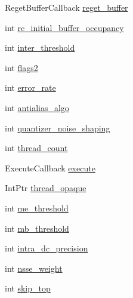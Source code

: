 \begin{DoxyCompactItemize}
RegetBufferCallback \hyperlink{struct_tao_1_1_f_fmpeg_1_1_f_fmpeg_1_1_a_v_codec_context_a8ffd6031f69dd5ce41136d91814a3319}{reget\_\-buffer}
\item 
int \hyperlink{struct_tao_1_1_f_fmpeg_1_1_f_fmpeg_1_1_a_v_codec_context_a3e2e4582550934341278cf82d6729469}{rc\_\-initial\_\-buffer\_\-occupancy}
\item 
int \hyperlink{struct_tao_1_1_f_fmpeg_1_1_f_fmpeg_1_1_a_v_codec_context_a86eb266bbe2b30943be9f0583295b32f}{inter\_\-threshold}
\item 
int \hyperlink{struct_tao_1_1_f_fmpeg_1_1_f_fmpeg_1_1_a_v_codec_context_a28bb12c9c401b6240677df9f54ca88d1}{flags2}
\item 
int \hyperlink{struct_tao_1_1_f_fmpeg_1_1_f_fmpeg_1_1_a_v_codec_context_a08aec2b15e9572f2fa0b3694540272e8}{error\_\-rate}
\item 
int \hyperlink{struct_tao_1_1_f_fmpeg_1_1_f_fmpeg_1_1_a_v_codec_context_aa4d47b1e9e54329c794f3a90cc9f3600}{antialias\_\-algo}
\item 
int \hyperlink{struct_tao_1_1_f_fmpeg_1_1_f_fmpeg_1_1_a_v_codec_context_a2b551fbb06e37e03790f4be0f0a1bb8d}{quantizer\_\-noise\_\-shaping}
\item 
int \hyperlink{struct_tao_1_1_f_fmpeg_1_1_f_fmpeg_1_1_a_v_codec_context_a73ba3575babb9cd5543c81530a3085af}{thread\_\-count}
\item 
ExecuteCallback \hyperlink{struct_tao_1_1_f_fmpeg_1_1_f_fmpeg_1_1_a_v_codec_context_a715241b68abafe3d68f967b13e514bec}{execute}
\item 
IntPtr \hyperlink{struct_tao_1_1_f_fmpeg_1_1_f_fmpeg_1_1_a_v_codec_context_a68282e79583391c677104895769a5251}{thread\_\-opaque}
\item 
int \hyperlink{struct_tao_1_1_f_fmpeg_1_1_f_fmpeg_1_1_a_v_codec_context_a7655069d77b5fe638abf7f8ae54a1f26}{me\_\-threshold}
\item 
int \hyperlink{struct_tao_1_1_f_fmpeg_1_1_f_fmpeg_1_1_a_v_codec_context_a100ef2571ff67ad51643a2c1a68d080a}{mb\_\-threshold}
\item 
int \hyperlink{struct_tao_1_1_f_fmpeg_1_1_f_fmpeg_1_1_a_v_codec_context_aac12774efc670bf0d1983e8858ac0fc3}{intra\_\-dc\_\-precision}
\item 
int \hyperlink{struct_tao_1_1_f_fmpeg_1_1_f_fmpeg_1_1_a_v_codec_context_ada6d5e69e5a1b09065fef8645cc4f3ab}{nsse\_\-weight}
\item 
int \hyperlink{struct_tao_1_1_f_fmpeg_1_1_f_fmpeg_1_1_a_v_codec_context_a004c61a934ab324fd500e26ccf486469}{skip\_\-top}
\item 

\end{DoxyCompactItemize}
